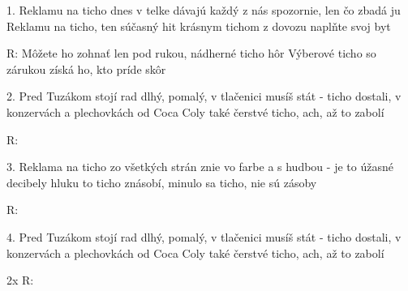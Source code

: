 \resetVars
{}
\MakeHeader
\Lyrics

1. Reklamu na ticho dnes v telke dávajú
každý z nás spozornie, len čo zbadá ju
Reklamu na ticho, ten súčasný hit
krásnym tichom z dovozu naplňte svoj byt

R: Môžete ho zohnať len pod rukou,
nádherné ticho hôr
Výberové ticho so zárukou
získá ho, kto príde skôr~

2. Pred Tuzákom stojí rad dlhý, pomalý,
   v tlačenici musíš stát - ticho dostali,
   v konzervách a plechovkách od Coca Coly
   také čerstvé ticho, ach, až to zabolí

R:

3. Reklama na ticho zo všetkých strán znie
   vo farbe a s hudbou - je to úžasné
   decibely hluku to ticho znásobí,
   minulo sa ticho, nie sú zásoby

R:

4. Pred Tuzákom stojí rad dlhý, pomalý,
   v tlačenici musíš stát - ticho dostali,
   v konzervách a plechovkách od Coca Coly
   také čerstvé ticho, ach, až to zabolí

2x R:

\Next
